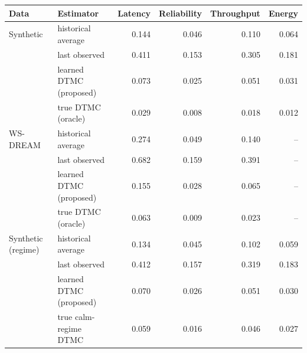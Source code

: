 \begin{tabular}{llrrrr}\toprule
Data & Estimator & Latency & Reliability & Throughput & Energy\\\midrule
Synthetic & historical average & 0.144 & 0.046 & 0.110 & 0.064\\
 & last observed & 0.411 & 0.153 & 0.305 & 0.181\\
 & learned DTMC (proposed) & 0.073 & 0.025 & 0.051 & 0.031\\
 & true DTMC (oracle) & 0.029 & 0.008 & 0.018 & 0.012\\
WS-DREAM & historical average & 0.274 & 0.049 & 0.140 & --\\
 & last observed & 0.682 & 0.159 & 0.391 & --\\
 & learned DTMC (proposed) & 0.155 & 0.028 & 0.065 & --\\
 & true DTMC (oracle) & 0.063 & 0.009 & 0.023 & --\\
Synthetic (regime) & historical average & 0.134 & 0.045 & 0.102 & 0.059\\
 & last observed & 0.412 & 0.157 & 0.319 & 0.183\\
 & learned DTMC (proposed) & 0.070 & 0.026 & 0.051 & 0.030\\
 & true calm-regime DTMC & 0.059 & 0.016 & 0.046 & 0.027\\
\bottomrule
\end{tabular}